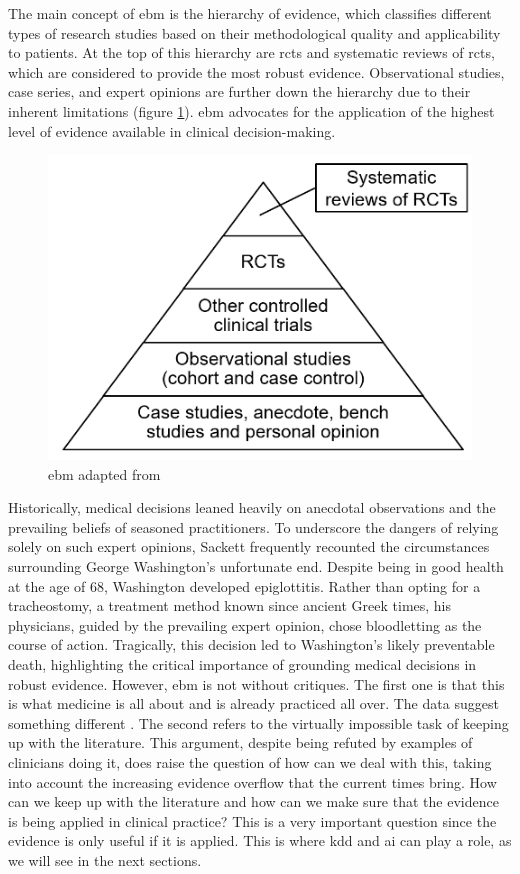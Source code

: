 The main concept of \ac{ebm} is the hierarchy of evidence, which classifies different types of research studies based on their methodological quality and applicability to patients. At the top of this hierarchy are \acp{rct} and systematic reviews of \acp{rct}, which are considered to provide the most robust evidence. Observational studies, case series, and expert opinions are further down the hierarchy due to their inherent limitations (figure \ref{fig:ebm}). \ac{ebm} advocates for the application of the highest level of evidence available in clinical decision-making.
\begin{figure}
    \centering
    \includegraphics[scale=0.55]{figures/ebm.png}
    
    \caption{\ac{ebm}  adapted from \cite{greenhalghHowReadPaper2019}} \label{fig:ebm}
    \end{figure}

Historically, medical decisions leaned heavily on anecdotal observations and the prevailing beliefs of seasoned practitioners. To underscore the dangers of relying solely on such expert opinions, Sackett frequently recounted the circumstances surrounding George Washington's unfortunate end. Despite being in good health at the age of 68, Washington developed epiglottitis. Rather than opting for a tracheostomy, a treatment method known since ancient Greek times, his physicians, guided by the prevailing expert opinion, chose bloodletting as the course of action. Tragically, this decision led to Washington's likely preventable death, highlighting the critical importance of grounding medical decisions in robust evidence.
However, \ac{ebm} is not without critiques. The first one is that this is what medicine is all about and is already practiced all over. The data suggest something different \cite{sackettEvidenceBasedMedicine1996}.
The second refers to the virtually impossible task of keeping up with the literature. This argument, despite being refuted by examples of clinicians doing it, does raise the question of how can we deal with this, taking into account the increasing evidence overflow that the current times bring. How can we keep up with the literature and how can we make sure that the evidence is being applied in clinical practice? This is a very important question since the evidence is only useful if it is applied. This is where \ac{kdd} and \ac{ai} can play a role, as we will see in the next sections. 


